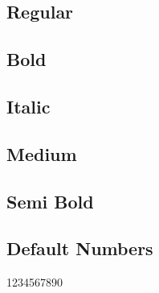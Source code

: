 \documentclass{article}
\begin{document}
\subsection*{Regular}
\lipsum[1]


\subsection*{Bold}

\textbf{\lipsum[2]}

\subsection*{Italic}

\textit{\lipsum[3]}
\subsection*{Medium}
{\selectfont\lipsum[5]}

\subsection*{Semi Bold}

{\selectfont\lipsum[6]}




\subsection*{Default Numbers}

1234567890
\end{document}
